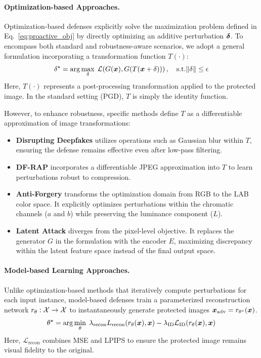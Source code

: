 \documentclass{article}
\begin{document}
\paragraph{Optimization-based Approaches.}
Optimization-based defenses explicitly solve the maximization problem defined in Eq.~\ref{eq:proactive_obj} by directly optimizing an additive perturbation $\bm{\delta}$. To encompass both standard and robustness-aware scenarios, we adopt a general formulation incorporating a transformation function $T(\cdot)$:
\begin{equation}
\delta^{\star} = \arg\max_{\delta} \;
\mathcal{L}\!\left(G({\bm{x}}), G(T({\bm{x}} + \delta))\right), \quad \text{s.t.}  \|\delta\| \le \epsilon
\end{equation}
Here, $T(\cdot)$ represents a post-processing transformation applied to the protected image. In the standard setting (PGD), $T$ is simply the identity function.

However, to enhance robustness, specific methods define $T$ as a differentiable approximation of image transformations:
\begin{itemize}[leftmargin=*, nosep]
    \item \textbf{Disrupting Deepfakes} utilizes operations such as Gaussian blur within $T$, ensuring the defense remains effective even after low-pass filtering.
    \item \textbf{DF-RAP} incorporates a differentiable JPEG approximation into $T$ to learn perturbations robust to compression.
    \item \textbf{Anti-Forgery} transforms the optimization domain from RGB to the LAB color space. It explicitly optimizes perturbations within the chromatic channels ($a$ and $b$) while preserving the luminance component ($L$).
    \item \textbf{Latent Attack} diverges from the pixel-level objective. It replaces the generator $G$ in the formulation with the encoder $E$, maximizing discrepancy within the latent feature space instead of the final output space.
\end{itemize}

\paragraph{Model-based Learning Approaches.}
Unlike optimization-based methods that iteratively compute perturbations for each input instance, model-based defenses train a parameterized reconstruction network $r_\theta: {\mathcal{X}} \rightarrow {\mathcal{X}}$ to instantaneously generate protected images ${\bm{x}}_{\mathrm{adv}} = r_{\theta^{\star}}({\bm{x}})$.
\begin{equation}
\theta^{\star} = \arg\min_{\theta} \; \lambda_\mathrm{recon}L_\mathrm{recon}\!\left(r_\theta({\bm{x}}), {\bm{x}}\right) - \lambda_\mathrm{ID}\mathcal{L}_{\mathrm{ID}}\!\left(r_\theta({\bm{x}}), {\bm{x}}\right)
\end{equation}
Here, $\mathcal{L}_{\mathrm{recon}}$ combines MSE and LPIPS to ensure the protected image remains visual fidelity to the original.
\end{document}
